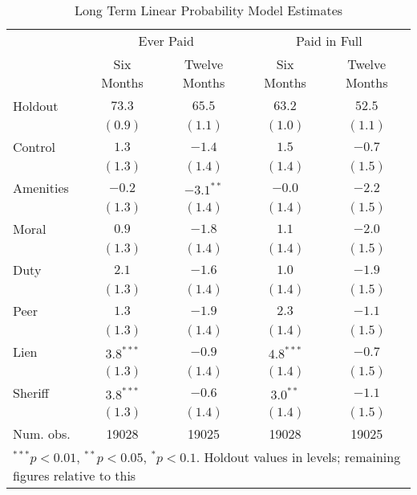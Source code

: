 \documentclass[12pt]{article}
\begin{document}
\begin{table}
\caption{Long Term Linear Probability Model Estimates}
\begin{center}
\begin{tabular}{l c c c c }
\hline
 & \multicolumn{2}{c}{Ever Paid} & \multicolumn{2}{c}{Paid in Full} \\
          & Six Months & Twelve Months & Six Months & Twelve Months \\
Holdout   & $73.3$ & $65.5$ & $63.2$ & $52.5$ \\
\hline
          & $(0.9)$      & $(1.1)$      & $(1.0)$      & $(1.1)$      \\
Control   & $1.3$        & $-1.4$       & $1.5$        & $-0.7$       \\
          & $(1.3)$      & $(1.4)$      & $(1.4)$      & $(1.5)$      \\
Amenities & $-0.2$       & $-3.1^{**}$  & $-0.0$       & $-2.2$       \\
          & $(1.3)$      & $(1.4)$      & $(1.4)$      & $(1.5)$      \\
Moral     & $0.9$        & $-1.8$       & $1.1$        & $-2.0$       \\
          & $(1.3)$      & $(1.4)$      & $(1.4)$      & $(1.5)$      \\
Duty      & $2.1$        & $-1.6$       & $1.0$        & $-1.9$       \\
          & $(1.3)$      & $(1.4)$      & $(1.4)$      & $(1.5)$      \\
Peer      & $1.3$        & $-1.9$       & $2.3$        & $-1.1$       \\
          & $(1.3)$      & $(1.4)$      & $(1.4)$      & $(1.5)$      \\
Lien      & $3.8^{***}$  & $-0.9$       & $4.8^{***}$  & $-0.7$       \\
          & $(1.3)$      & $(1.4)$      & $(1.4)$      & $(1.5)$      \\
Sheriff   & $3.8^{***}$  & $-0.6$       & $3.0^{**}$   & $-1.1$       \\
          & $(1.3)$      & $(1.4)$      & $(1.4)$      & $(1.5)$      \\
\hline
Num. obs. & 19028        & 19025        & 19028        & 19025        \\
\hline
\multicolumn{5}{l}{\scriptsize{$^{***}p<0.01$, $^{**}p<0.05$, $^*p<0.1$. Holdout values in levels; remaining figures relative to this}}
\end{tabular}
\label{lg_pc_lin}
\end{center}
\end{table}
\end{document}
